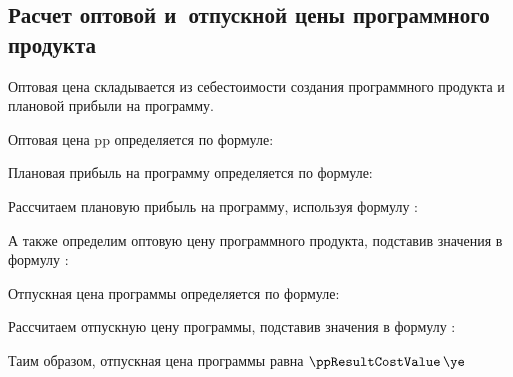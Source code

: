 \subsection{Расчет оптовой и~отпускной цены программного продукта}
\label{sec:economics:ppoptcost}

Оптовая цена складывается из себестоимости создания программного продукта и плановой прибыли на программу.

Оптовая цена \gls{pp} определяется по формуле:
\ppOptPriceEquation

Плановая прибыль на программу определяется по формуле:
\plannedSoftIncomeEquation

Рассчитаем плановую прибыль на программу, используя формулу :
\plannedSoftIncomeFormulaApplied

А также определим оптовую цену программного продукта, подставив значения в формулу :
\ppOptPriceFormulaApplied

Отпускная цена программы определяется по формуле:
\ppResultCostEquation

Рассчитаем отпускную цену программы, подставив значения в формулу :
\ppResultCostFormulaApplied

Таим образом, отпускная цена программы равна \(\ppResultCostValue \, \ye\)